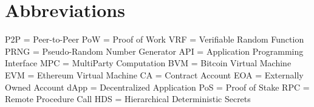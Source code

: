 \chapter*{Abbreviations}

P2P = Peer-to-Peer \newline %
PoW = Proof of Work \newline %
VRF = Verifiable Random Function \newline %
PRNG = Pseudo-Random Number Generator \newline %
API = Application Programming Interface \newline %
MPC = MultiParty Computation \newline %
BVM = Bitcoin Virtual Machine \newline %
EVM = Ethereum Virtual Machine \newline %
CA = Contract Account \newline %
EOA = Externally Owned Account \newline %
dApp = Decentralized Application \newline %
PoS = Proof of Stake \newline
RPC = Remote Procedure Call \newline
HDS = Hierarchical Deterministic Secrets \newline
